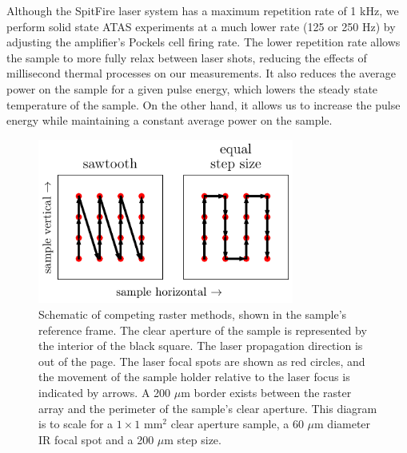 Although the SpitFire laser system has a maximum repetition rate of 1 kHz, we perform solid state ATAS experiments at a much lower rate (125 or 250 Hz) by adjusting the amplifier's Pockels cell firing rate. The lower repetition rate allows the sample to more fully relax between laser shots, reducing the effects of millisecond thermal processes on our measurements. It also reduces the average power on the sample for a given pulse energy, which lowers the steady state temperature of the sample. On the other hand, it allows us to increase the pulse energy while maintaining a constant average power on the sample.

\begin{figure}
	\centering
	\includegraphics[width=0.75\textwidth]{figures/chap4/rastering_methods.pdf}
	\caption{Schematic of competing raster methods, shown in the sample's reference frame. The clear aperture of the sample is represented by the interior of the black square. The laser propagation direction is out of the page. The laser focal spots are shown as red circles, and the movement of the sample holder relative to the laser focus is indicated by arrows. A 200 $\mu$m border exists between the raster array and the perimeter of the sample's clear aperture. This diagram is to scale for a $1\times1$ mm$^2$ clear aperture sample, a 60 $\mu$m diameter IR focal spot and a 200 $\mu$m step size.}
	\label{fig:Rastering_Methods}
\end{figure}

